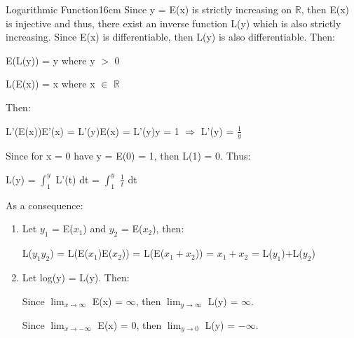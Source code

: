     \begin{definition}{Logarithmic Function}{16cm}
        Since y = E(x) is strictly increasing on $\mathbb{R}$, then E(x) is injective
        and thus, there exist an inverse function L(y) which is also strictly
        increasing. Since E(x) is differentiable, then L(y) is also
        differentiable. Then:

        \hspace{0.5cm}
        E(L(y)) = y
        \hspace{1cm}
        where y $>$ 0

        \hspace{0.5cm}
        L(E(x)) = x
        \hspace{1cm}
        where x $\in$ $\mathbb{R}$

        Then:

        \hspace{0.5cm}
        L'(E(x))E'(x) = L'(y)E(x) = L'(y)y = 1
        \hspace{1cm}
        $\Rightarrow$
        \hspace{1cm}
        L'(y) = $\frac{1}{y}$

        Since for x = 0 have y = E(0) = 1, then L(1) = 0.
        Thus:

        \hspace{0.5cm}
        L(y) = $\int_1^y$ L'(t) dt
        = $\int_1^y$ $\frac{1}{t}$ dt

        As a consequence:

        \begin{enumerate}[label=(\alph*), leftmargin=1.5cm, itemsep=0.1cm]
            \item Let $y_1$ = E($x_1$) and $y_2$ = E($x_2$), then:
            
                \hspace{0.5cm}
                L($y_1y_2$)
                = L(E($x_1$)E($x_2$))
                = L(E($x_1+x_2$))
                = $x_1+x_2$
                = L($y_1$)+L($y_2$)

            \item Let log(y) = L(y). Then:
            
                \hspace{0.5cm}
                Since $\lim_{x \rightarrow \infty}$ E(x) = $\infty$,
                then $\lim_{y \rightarrow \infty}$ L(y) = $\infty$.

                \hspace{0.5cm}
                Since $\lim_{x \rightarrow -\infty}$ E(x) = 0,
                then $\lim_{y \rightarrow 0}$ L(y) = $-\infty$.


\end{enumerate}
\end{definition}

